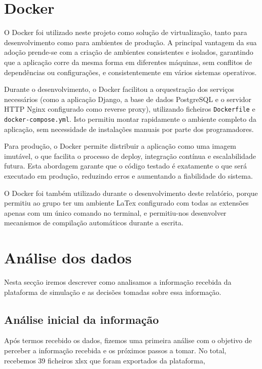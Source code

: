 \section{Docker}

O Docker foi utilizado neste projeto como solução de virtualização, tanto para desenvolvimento como para ambientes de produção. A principal vantagem da sua adoção prende-se com a criação de ambientes consistentes e isolados, garantindo que a aplicação corre da mesma forma em diferentes máquinas, sem conflitos de dependências ou configurações, e consistentemente em vários sistemas operativos.

Durante o desenvolvimento, o Docker facilitou a orquestração dos serviços necessários (como a aplicação Django, a base de dados PostgreSQL e o servidor HTTP Nginx configurado como reverse proxy), utilizando ficheiros \texttt{Dockerfile} e \texttt{docker-compose.yml}. Isto permitiu montar rapidamente o ambiente completo da aplicação, sem necessidade de instalações manuais por parte dos programadores.

Para produção, o Docker permite distribuir a aplicação como uma imagem imutável, o que facilita o processo de deploy, integração contínua e escalabilidade futura. Esta abordagem garante que o código testado é exatamente o que será executado em produção, reduzindo erros e aumentando a fiabilidade do sistema.

O Docker foi também utilizado durante o desenvolvimento deste relatório, porque permitiu ao grupo ter um ambiente LaTex configurado com todas as extensões apenas com um único comando no terminal, e permitiu-nos desenvolver mecanismos de compilação automáticos durante a escrita. 

\section{Análise dos dados}
Nesta secção iremos descrever como analisamos a informação recebida da plataforma de simulação e as decisões tomadas sobre essa informação.

\subsection{Análise inicial da informação}
Após termos recebido os dados, fizemos uma primeira análise com o objetivo de perceber a informação recebida e os próximos passos a tomar. No total, recebemos 39 ficheiros \gls{xlsx} que foram exportados da plataforma, 

